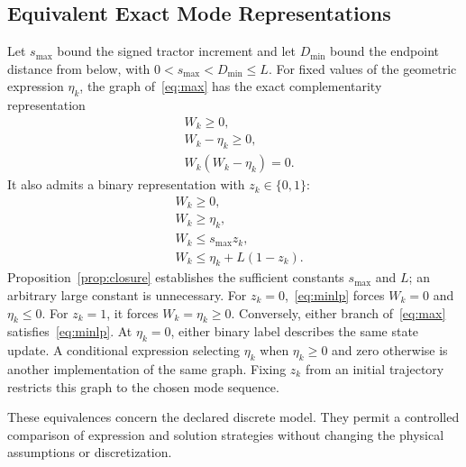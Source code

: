 \subsection{Equivalent Exact Mode Representations}
Let $s_{\max}$ bound the signed tractor increment and let $D_{\min}$ bound the endpoint distance from below, with $0<s_{\max}<D_{\min}\leq L$. For fixed values of the geometric expression $\eta_k$, the graph of~\eqref{eq:max} has the exact complementarity representation
\begin{equation}
\begin{aligned}
 &W_k\geq0,\\
 &W_k-\eta_k\geq0,\\
 &W_k(W_k-\eta_k)=0.
\end{aligned}
\label{eq:comp}
\end{equation}
It also admits a binary representation with $z_k\in\{0,1\}$:
\begin{equation}\begin{aligned}
 &W_k\geq0,\\
 &W_k\geq\eta_k,\\
 &W_k\leq s_{\max}z_k,\\
 &W_k\leq\eta_k+L(1-z_k).
\end{aligned}\label{eq:minlp}\end{equation}
Proposition~\ref{prop:closure} establishes the sufficient constants $s_{\max}$ and $L$; an arbitrary large constant is unnecessary. For $z_k=0$,~\eqref{eq:minlp} forces $W_k=0$ and $\eta_k\leq0$. For $z_k=1$, it forces $W_k=\eta_k\geq0$. Conversely, either branch of~\eqref{eq:max} satisfies~\eqref{eq:minlp}. At $\eta_k=0$, either binary label describes the same state update. A conditional expression selecting $\eta_k$ when $\eta_k\geq0$ and zero otherwise is another implementation of the same graph. Fixing $z_k$ from an initial trajectory restricts this graph to the chosen mode sequence.

These equivalences concern the declared discrete model. They permit a controlled comparison of expression and solution strategies without changing the physical assumptions or discretization.

